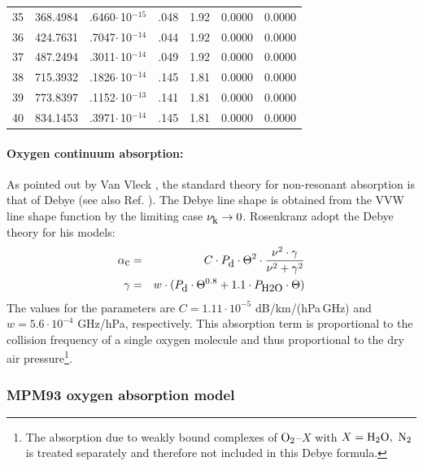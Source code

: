 \begin{longtable}{lrrrrrr}
35 & 368.4984 & .6460$\cdot$\,10$^{-15}$ & .048 & 1.92 & 0.0000 & 0.0000 \\
36 & 424.7631 & .7047$\cdot$\,10$^{-14}$ & .044 & 1.92 & 0.0000 & 0.0000 \\
37 & 487.2494 & .3011$\cdot$\,10$^{-14}$ & .049 & 1.92 & 0.0000 & 0.0000 \\
38 & 715.3932 & .1826$\cdot$\,10$^{-14}$ & .145 & 1.81 & 0.0000 & 0.0000 \\
39 & 773.8397 & .1152$\cdot$\,10$^{-13}$ & .141 & 1.81 & 0.0000 & 0.0000 \\
40 & 834.1453 &  .3971$\cdot$\,10$^{-14}$ & .145 & 1.81 & 0.0000 & 0.0000 \\
\end{longtable}

\paragraph{Oxygen continuum absorption:}
\label{levele:pwr98_o2cont}
As pointed out by Van Vleck \citep{vv:87}, the standard theory for
non-resonant absorption is that of Debye (see also Ref. \citet{townes:55}). 
The Debye line shape is obtained from the VVW line shape function by
the limiting case $\nu_{\mbox{\rm \small k}} \rightarrow 0$.
Rosenkranz \citet{pwr:93} adopt the Debye theory for his models: 
\begin{eqnarray}
  \label{eq:abs_theory:pwr_o2cont}
  \alphac &=&  C \cdot \pda \cdot \Theta^2 \cdot 
             \frac{\nu^2 \cdot \gamma}{\nu^2+\gamma^2}\\
%
  \label{eq:abs_theory:pwr_o2cont_1}
  \gamma &=&  w \cdot (\pda \cdot \Theta^{0.8} + 1.1 \cdot \phzo \cdot
  \Theta)
\end{eqnarray}
The values for the parameters are $C = 1.11\cdot 10^{-5}$ dB/km/(hPa\,GHz) and 
$w = 5.6 \cdot 10^{-4}$ GHz/hPa, respectively. This absorption
term is proportional to the collision frequency of a single oxygen molecule
and thus proportional to the dry air pressure\footnote{The absorption
  due to weakly bound complexes of $\mbox{O}_2$--$X$ with $X=\mbox{H}_2\mbox{O},~\mbox{N}_2$ is 
  treated separately and therefore not included in this Debye
  formula.}.






\subsubsection{MPM93 oxygen absorption model}
\label{sec:abs_theory:O2_mpm93}

